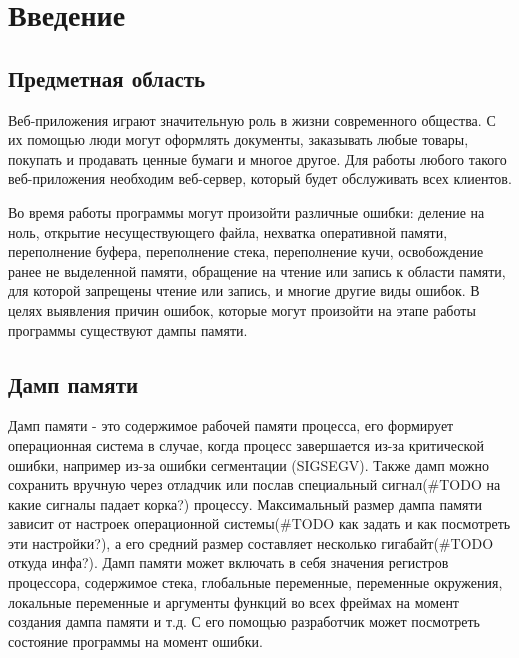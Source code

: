 \documentclass[20pt]{article}
\begin{document}
\newpage

\tableofcontents

\newpage

\section{Введение}

\subsection{Предметная область}
Веб-приложения играют значительную роль в жизни современного общества. С их
помощью люди могут оформлять документы, заказывать любые товары, покупать и
продавать ценные бумаги и многое другое. Для работы любого такого веб-приложения
необходим веб-сервер, который будет обслуживать всех клиентов.

Во время работы программы могут произойти различные ошибки\cite{error_types}:
деление на ноль, открытие несуществующего файла, нехватка оперативной памяти,
переполнение буфера, переполнение стека, переполнение кучи, освобождение ранее
не выделенной памяти, обращение на чтение или запись к области памяти, для
которой запрещены чтение или запись, и многие другие виды ошибок. В целях
выявления причин ошибок, которые могут произойти на этапе работы программы
существуют дампы памяти.

\subsection{Дамп памяти}

Дамп памяти\cite{wiki/coredump} - это содержимое рабочей памяти процесса, его
формирует операционная система в случае, когда процесс завершается из-за
критической ошибки, например из-за ошибки сегментации (SIGSEGV). Также дамп можно
сохранить вручную через отладчик или послав специальный сигнал(#TODO на какие сигналы падает корка?) процессу.
Максимальный размер дампа памяти зависит от настроек операционной системы(#TODO как задать и как посмотреть эти настройки?), а его
средний размер составляет несколько гигабайт(#TODO откуда инфа?). Дамп памяти может включать в себя
значения регистров процессора, содержимое стека, глобальные переменные,
переменные окружения, локальные переменные и аргументы функций во всех фреймах
на момент создания дампа памяти и т.д. С его помощью разработчик может посмотреть
состояние программы на момент ошибки.
\end{document}
